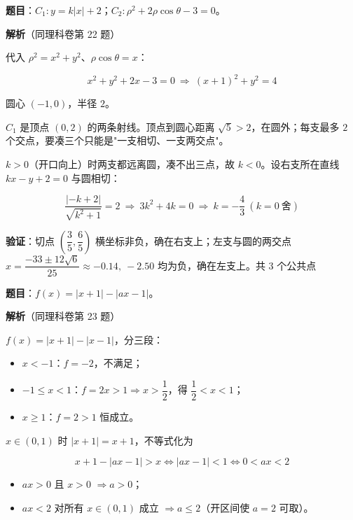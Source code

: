 
\textbf{题目}：$C_1:y=k|x|+2$；$C_2:\rho^{2}+2\rho\cos\theta-3=0$。

\textbf{解析}（同理科卷第 22 题）


代入 $\rho^{2}=x^{2}+y^{2}$、$\rho\cos\theta=x$：

\[x^{2}+y^{2}+2x-3=0\ \Longrightarrow\ (x+1)^{2}+y^{2}=4\]

圆心 $(-1,0)$，半径 $2$。


$C_1$ 是顶点 $(0,2)$ 的两条射线。顶点到圆心距离 $\sqrt5>2$，在圆外；每支最多 $2$ 个交点，要凑三个只能是"一支相切、一支两交点"。

$k>0$（开口向上）时两支都远离圆，凑不出三点，故 $k<0$。设右支所在直线 $kx-y+2=0$ 与圆相切：

\[\frac{|-k+2|}{\sqrt{k^{2}+1}}=2\ \Longrightarrow\ 3k^{2}+4k=0\ \Longrightarrow\ k=-\frac43\ (k=0\ \text{舍})\]

\textbf{验证}：切点 $\left(\dfrac35,\dfrac65\right)$ 横坐标非负，确在右支上；左支与圆的两交点 $x=\dfrac{-33\pm12\sqrt6}{25}\approx-0.14,\ -2.50$ 均为负，确在左支上。共 $3$ 个公共点 


\par\medskip


\textbf{题目}：$f(x)=|x+1|-|ax-1|$。

\textbf{解析}（同理科卷第 23 题）


$f(x)=|x+1|-|x-1|$，分三段：

\begin{itemize}
\item $x<-1$：$f=-2$，不满足；
\item $-1\le x<1$：$f=2x>1\Rightarrow x>\dfrac12$，得 $\dfrac12<x<1$；
\item $x\ge1$：$f=2>1$ 恒成立。
\end{itemize}



$x\in(0,1)$ 时 $|x+1|=x+1$，不等式化为

\[x+1-|ax-1|>x\iff|ax-1|<1\iff0<ax<2\]

\begin{itemize}
\item $ax>0$ 且 $x>0$ $\Rightarrow a>0$；
\item $ax<2$ 对所有 $x\in(0,1)$ 成立 $\Rightarrow a\le2$（开区间使 $a=2$ 可取）。
\end{itemize}

\gkanswer{答案：$(0,2]$}

\par\medskip

